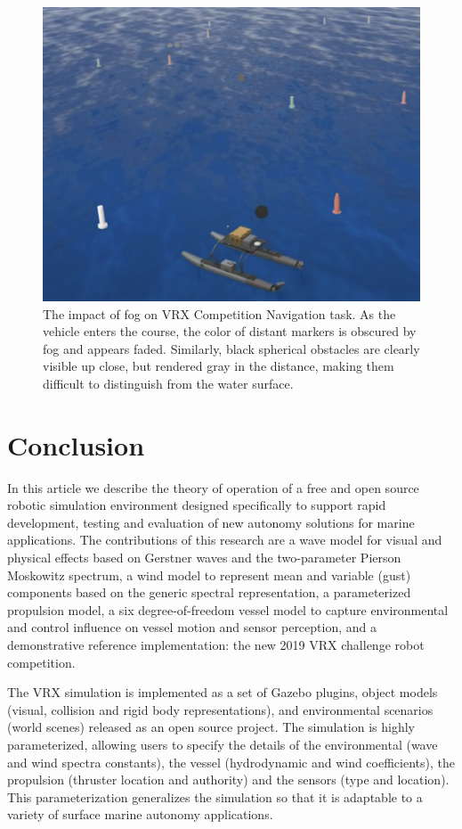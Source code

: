 \documentclass[utf8]{frontiersSCNS} %
\begin{document}
\begin{figure}[hbt!]
  \centering
  \includegraphics[width=\FigWidth\textwidth]{images/navigation_wide_fog_2.png}
  \caption{The impact of fog on VRX Competition Navigation task. As the vehicle enters the course, the color of distant markers is obscured by fog and appears faded. Similarly, black spherical obstacles are clearly visible up close, but rendered gray in the distance, making them difficult to distinguish from the water surface. }
  \label{f:navigation_fog}
\end{figure}

\section{Conclusion}

In this article we describe the theory of operation of a free and open source robotic simulation environment designed specifically to support rapid development, testing and evaluation of new autonomy solutions for marine applications.  The contributions of this research are a wave model for visual and physical effects based on Gerstner waves and the two-parameter Pierson Moskowitz spectrum, a wind model to represent mean and variable (gust) components based on the generic spectral representation, a parameterized propulsion model, a six degree-of-freedom vessel model to capture environmental and control influence on vessel motion and sensor perception, and a demonstrative reference implementation: the new 2019 VRX challenge robot competition.

The VRX simulation is implemented as a set of Gazebo plugins, object models (visual, collision and rigid body representations), and environmental scenarios (world scenes) released as an open source project.  The simulation is highly parameterized, allowing users to specify the details of the environmental (wave and wind spectra constants), the vessel (hydrodynamic and wind coefficients), the propulsion (thruster location and authority) and the sensors (type and location). This parameterization generalizes the simulation so that it is adaptable to a variety of surface marine autonomy applications.
\end{document}

